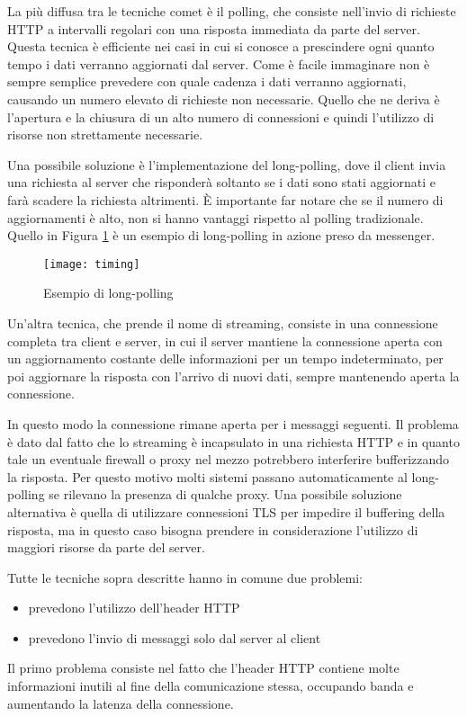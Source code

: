 La più diffusa tra le tecniche comet è il polling, che consiste nell'invio di richieste HTTP a intervalli regolari con una risposta immediata da parte del server. 
Questa tecnica è efficiente nei casi in cui si conosce a prescindere ogni quanto tempo i dati verranno aggiornati dal server.
Come è facile immaginare non è sempre semplice prevedere con quale cadenza i dati verranno aggiornati, causando un numero elevato di richieste non necessarie.
Quello che ne deriva è l'apertura e la chiusura di un alto numero di connessioni e quindi l'utilizzo di risorse non strettamente necessarie.

Una possibile soluzione è l'implementazione del long-polling, dove il client invia una richiesta al server che risponderà soltanto se i dati sono stati aggiornati e farà scadere la richiesta altrimenti. È importante far notare che se il numero di aggiornamenti è alto, non si hanno vantaggi rispetto al polling tradizionale.
Quello in Figura \ref{fig:timing} è un esempio di long-polling in azione preso da messenger. 

\begin{figure}[htpb!]
  \centering
  \texttt{[image: timing]}
  \caption{Esempio di long-polling}
  \label{fig:timing}
\end{figure}

Un'altra tecnica, che prende il nome di streaming, consiste in una connessione completa tra client e server, in cui il server mantiene la connessione aperta con un aggiornamento costante delle informazioni per un tempo indeterminato, per poi aggiornare la risposta con l'arrivo di nuovi dati, sempre mantenendo aperta la connessione.

In questo modo la connessione rimane aperta per i messaggi seguenti.
Il problema è dato dal fatto che lo streaming è incapsulato in una richiesta HTTP e in quanto tale un eventuale firewall o proxy nel mezzo potrebbero interferire bufferizzando la risposta.
Per questo motivo molti sistemi passano automaticamente al long-polling se rilevano la presenza di qualche proxy.
Una possibile soluzione alternativa è quella di utilizzare connessioni TLS per impedire il buffering della risposta,
ma in questo caso bisogna prendere in considerazione l'utilizzo di
maggiori risorse da parte del server.

Tutte le tecniche sopra descritte hanno in comune due problemi:
\begin{itemize}
\item prevedono l'utilizzo dell'header HTTP
\item prevedono l'invio di messaggi solo dal server al client
\end{itemize}
Il primo problema consiste nel fatto che l'header HTTP contiene molte informazioni inutili al fine della comunicazione stessa, occupando banda e aumentando la latenza della connessione.

